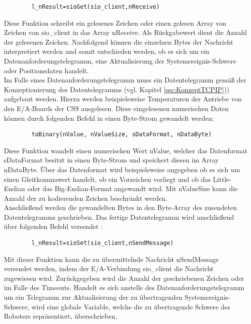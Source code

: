 \documentclass[ a4paper,
                oneside,
                toc=bibliography,
                toc=listof
                ]{scrbook}
\begin{document}
	\begin{lstlisting}
		l_nResult=sioGet(sio_client,nReceive)
	\end{lstlisting}
	Diese Funktion schreibt ein gelesenes Zeichen oder einen gelesen Array von Zeichen von sio\_client in das Array nReceive. Als Rückgabewert dient die Anzahl der gelesenen Zeichen. Nachfolgend können die einzelnen Bytes der Nachricht interpretiert werden und somit entschieden werden, ob es sich um ein Datenanforderungstelegramm, eine Aktualisierung der Systemereignis-Schwere oder Positionsdaten handelt. \cite{VAL3} \cite{CS9_TCP}\\
	Im Falle eines Datenanforderungstelegramm muss ein Datentelegramm gemäß der Konzeptionierung des Datentelegramms (vgl. Kapitel \ref{sec:KonzeptTCPIP})) aufgebaut werden. Hierzu werden beispielsweise Temperaturen der Antriebe von den E/A-Boards der CS9 ausgelesen. Diese eingelesenen numerischen Daten können durch folgenden Befehl in einen Byte-Strom gewandelt werden:
	\begin{lstlisting}
		toBinary(nValue, nValueSize, sDataFormat, nDataByte)
	\end{lstlisting}
	Diese Funktion wandelt einen numerischen Wert nValue, welcher das Datenformat sDataFormat besitzt in einen Byte-Strom und speichert diesen im Array nDataByte. Über das Datenformat wird beispielsweise angegeben ob es sich um einen Gleitkommawert handelt, ob ein Vorzeichen vorliegt und ob das Little-Endian oder das Big-Endian-Format angewandt wird. Mit nValueSize kann die Anzahl der zu kodierenden Zeichen beschränkt werden.\\
	Anschließend werden die gewandelten Bytes in den Byte-Array des zusendeten Datentelegramms geschrieben. Das fertige Datentelegramm wird anschließend über folgenden Befehl versendet \cite{VAL3}:
	\begin{lstlisting}
		l_nResult=sioSet(sio_client,nSendMessage)
	\end{lstlisting}
	Mit dieser Funktion kann die zu übermittelnde Nachricht nSendMessage versendet werden, indem der E/A-Verbindung sio\_client die Nachricht zugewiesen wird. Zurückgegeben wird die Anzahl der geschriebenen Zeichen oder \grqq{} im Falle des Timeouts. Handelt es sich anstelle des Datenanforderungstelegramm um ein Telegramm zur Aktualisierung der zu übertragenden Systemereignis-Schwere, wird eine globale Variable, welche die zu übertragende Schwere des Roboters repräsentiert, überschrieben. \cite{VAL3} \cite{CS9_TCP}\vspace{0.5\baselineskip}\\
\end{document}
